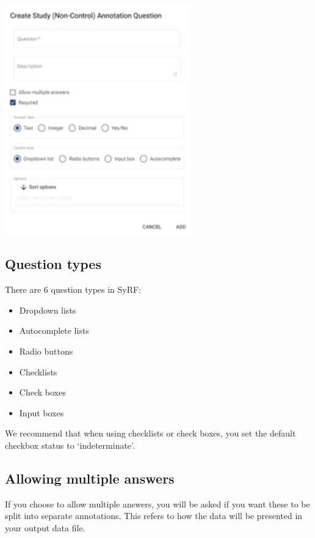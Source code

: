 \documentclass[
]{book}
\providecommand{\tightlist}{%
  \setlength{\itemsep}{0pt}\setlength{\parskip}{0pt}}
\begin{document}
\includegraphics[width=3.19in]{figs/Fig_Question_dialogue}

\hypertarget{question-types}{%
\subsection{Question types}\label{question-types}}

There are 6 question types in SyRF:

\begin{itemize}
\tightlist
\item
  Dropdown lists
\item
  Autocomplete lists
\item
  Radio buttons
\item
  Checklists
\item
  Check boxes
\item
  Input boxes
\end{itemize}

We recommend that when using checklists or check boxes, you set the default checkbox status to `indeterminate'.

\hypertarget{allowing-multiple-answers}{%
\subsection{Allowing multiple answers}\label{allowing-multiple-answers}}

If you choose to allow multiple answers, you will be asked if you want these to be split into separate annotations. This refers to how the data will be presented in your output data file.
\end{document}
